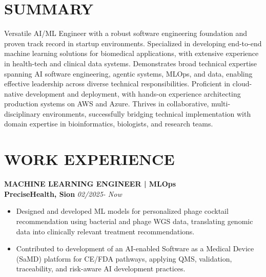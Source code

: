 \documentclass[9pt, letterpaper]{extarticle}
\begin{document}
\noindent
\begin{minipage}[t]{0.64\textwidth}
\raggedright


\section{SUMMARY}
\small
Versatile AI/ML Engineer with a robust software engineering foundation and proven track record in startup environments. Specialized in developing end-to-end machine learning solutions for biomedical applications, with extensive experience in health-tech and clinical data systems. Demonstrates broad technical expertise spanning AI software engineering, agentic systems, MLOps, and data, enabling effective leadership across diverse technical responsibilities. Proficient in cloud-native development and deployment, with hands-on experience architecting production systems on AWS and Azure. Thrives in collaborative, multi-disciplinary environments, successfully bridging technical implementation with domain expertise in bioinformatics, biologists, and research teams.

\section{WORK EXPERIENCE}

\textbf{MACHINE LEARNING ENGINEER | MLOps} \\
\textbf{PreciseHealth, Sion} \hfill \textit{02/2025- Now}
\small
\begin{itemize}
    \item Designed and developed ML models for personalized phage cocktail recommendation using bacterial and phage WGS data, translating genomic data into clinically relevant treatment recommendations.
    
    \item Contributed to development of an AI-enabled Software as a Medical Device (SaMD) platform for CE/FDA pathways, applying QMS, validation, traceability, and risk-aware AI development practices.
    

\end{itemize}
\end{minipage}
\end{document}
